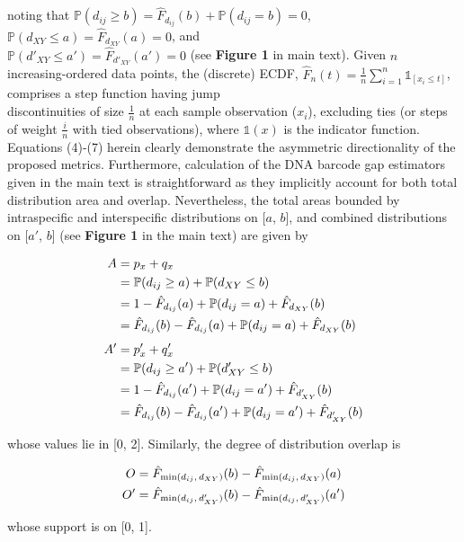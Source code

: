 \documentclass[12pt]{article}
\begin{document}
\noindent noting that $\mathbb{P}(d_{ij} \geq b) = \hat{F}_{d_{ij}}(b) +\mathbb{P}(d_{ij} = b) = 0$, $\mathbb{P}(d_{XY} \leq a) = \hat{F}_{d_{XY}}(a) = 0$, and \\ $\mathbb{P}(d'_{XY} \leq a') = \hat{F}_{d'_{XY}}(a') = 0$ (see \textbf{Figure 1} in main text). Given $n$ increasing-ordered data points, the (discrete) ECDF, $\hat{F}_n(t) = \frac{1}{n}\sum_{i = 1}^n\mathds{1}_{[x_i \leq t]}$, comprises a step function having jump \\ discontinuities of size $\frac{1}{n}$ at each sample observation ($x_i$), excluding ties (or steps of weight $\frac{i}{n}$ with tied observations), where $\mathds{1}(x)$ is the indicator function. Equations (4)-(7) herein clearly demonstrate the asymmetric directionality of the proposed metrics. Furthermore, calculation of the DNA barcode gap estimators given in the main text is straightforward as they implicitly account for both total distribution area and overlap. Nevertheless, the total areas bounded by intraspecific and interspecific distributions on [$a$, $b$], and combined distributions on [$a'$, $b$] (see \textbf{Figure 1} in the main text) are given by

\begin{align}
\notag A &= p_x + q_x \\ 
\notag &= \mathbb{P}(d_{ij} \geq a) + \mathbb{P}(d_{XY} \leq b) \\
\notag  &= 1 - \hat{F}_{d_{ij}}(a) + \mathbb{P}(d_{ij} = a) + \hat{F}_{d_{XY}}(b) \\
  &= \hat{F}_{d_{ij}}(b) - \hat{F}_{d_{ij}}(a) + \mathbb{P}(d_{ij} = a) + \hat{F}_{d_{XY}}(b) \\[1ex]
\notag A' &= p'_x + q'_x \\
\notag &= \mathbb{P}(d_{ij} \geq a') + \mathbb{P}(d'_{XY} \leq b) \\
\notag &= 1 - \hat{F}_{d_{ij}}(a') + \mathbb{P}(d_{ij} = a') + \hat{F}_{d'_{XY}}(b) \\
  &= \hat{F}_{d_{ij}}(b) - \hat{F}_{d_{ij}}(a') + \mathbb{P}(d_{ij} = a') + \hat{F}_{d'_{XY}}(b)
\end{align}

\noindent whose values lie in [0, 2]. Similarly, the degree of distribution overlap is

\begin{align}
O &= \hat{F}_{\mathrm{min}(d_{ij}, \hspace{0.5mm} d_{XY})}(b) - \hat{F}_{\mathrm{min}(d_{ij}, \hspace{0.5mm} d_{XY})}(a) \\
O' &= \hat{F}_{\mathrm{min}(d_{ij}, \hspace{0.5mm} d'_{XY})}(b) - \hat{F}_{\mathrm{min}(d_{ij}, \hspace{0.5mm} d'_{XY})}(a') 
\end{align}

\noindent whose support is on [0, 1].
\end{document}
